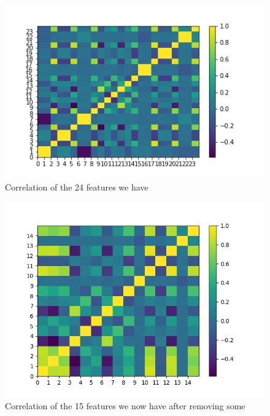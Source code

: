 \documentclass[idxtotoc,hyperref,openany]{labbook} %
\begin{document}
\begin{figure}[h]
\includegraphics[width=0.9\linewidth]{Features_CorrelationMatrix_preDrop_Day2.png}
\setlength\belowcaptionskip{-10pt}
\caption{Correlation of the 24 features we have}
\label{Correlation predrop2}
\end{figure}

\begin{figure}[h]
\includegraphics[width=0.9\linewidth]{Features_CorrelationMatrix_postDrop_Day2.png}
\setlength\belowcaptionskip{-10pt}
\caption{Correlation of the 15 features we now have after removing some}
\label{Correlation postdrop2}
\end{figure}
\end{document}
